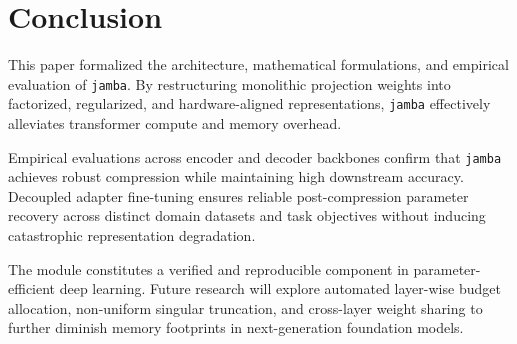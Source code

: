 \section{Conclusion}
This paper formalized the architecture, mathematical formulations, and empirical evaluation of \texttt{jamba}. By restructuring monolithic projection weights into factorized, regularized, and hardware-aligned representations, \texttt{jamba} effectively alleviates transformer compute and memory overhead.

Empirical evaluations across encoder and decoder backbones confirm that \texttt{jamba} achieves robust compression while maintaining high downstream accuracy. Decoupled adapter fine-tuning ensures reliable post-compression parameter recovery across distinct domain datasets and task objectives without inducing catastrophic representation degradation.

The module constitutes a verified and reproducible component in parameter-efficient deep learning. Future research will explore automated layer-wise budget allocation, non-uniform singular truncation, and cross-layer weight sharing to further diminish memory footprints in next-generation foundation models.
